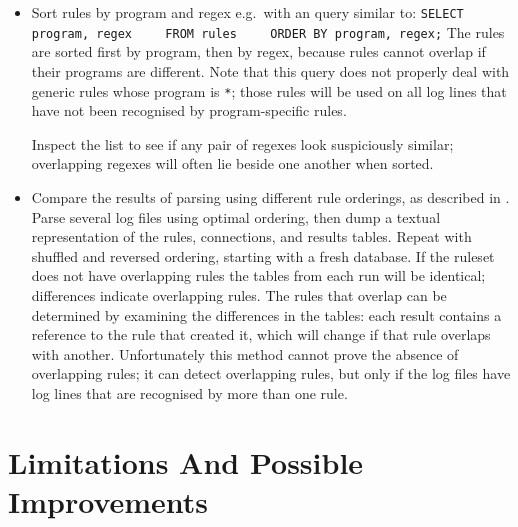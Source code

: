 \begin{itemize}

    \item Sort rules by program and regex e.g.\ with an  query
        similar to:                                     \newline{}
        \verb!SELECT program, regex!                    \newline{}
        \verb!    FROM rules!                           \newline{}
        \verb!    ORDER BY program, regex;!             \newline{}
        The rules are sorted first by program, then by regex, because rules
        cannot overlap if their programs are different.  Note that this
        query does not properly deal with generic rules whose program is
        \texttt{*}; those rules will be used on all log lines that have not
        been recognised by program-specific rules.

        Inspect the list to see if any pair of regexes look suspiciously
        similar; overlapping regexes will often lie beside one another when
        sorted.

    \item Compare the results of parsing using different rule orderings, as
        described in .  Parse
        several log files using optimal ordering, then dump a textual
        representation of the rules, connections, and results tables.
        Repeat with shuffled and reversed ordering, starting with a fresh
        database.  If the ruleset does not have overlapping rules the
        tables from each run will be identical; differences indicate
        overlapping rules.  The rules that overlap can be determined by
        examining the differences in the tables: each result contains a
        reference to the rule that created it, which will change if that
        rule overlaps with another.  Unfortunately this method cannot prove
        the absence of overlapping rules; it can detect overlapping rules,
        but only if the log files have log lines that are recognised by
        more than one rule.

\end{itemize}



\newpage{}

\section{Limitations And Possible Improvements}


